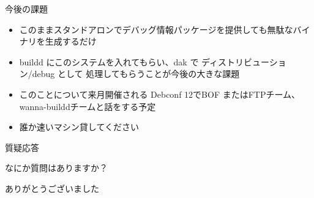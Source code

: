 \begin{frame}{今後の課題}

\begin{itemize}[<+->]
\item このままスタンドアロンでデバッグ情報パッケージを提供しても無駄なバイナリを生成するだけ
\item buildd にこのシステムを入れてもらい、dak で ディストリビューション/debug として
処理してもらうことが今後の大きな課題
\item このことについて来月開催される Debconf 12でBOF またはFTPチーム、wanna-builddチームと話をする予定
\item 誰か速いマシン貸してください
\end{itemize}
\end{frame}

\begin{frame}{質疑応答}

\begin{center}
なにか質問はありますか？
\end{center}

\begin{center}
ありがとうございました
\end{center}

\end{frame}


